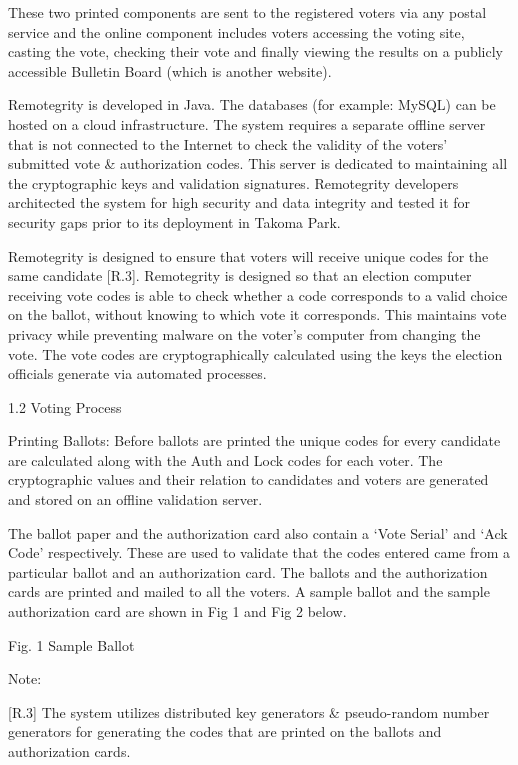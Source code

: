 These two printed components are sent to the registered voters via any postal service and the online component includes voters accessing the voting site, casting the vote, checking their vote and finally viewing the results on a publicly accessible Bulletin Board (which is another website).

Remotegrity is developed in Java. The databases (for example: MySQL) can be hosted on a cloud infrastructure. The system requires a separate offline server that is not connected to the Internet to check the validity of the voters' submitted vote \& authorization codes. This server is dedicated to maintaining all the cryptographic keys and validation signatures. Remotegrity developers architected the system for high security and data integrity and tested it for security gaps prior to its deployment in Takoma Park.

Remotegrity is designed to ensure that voters will receive unique codes for the same candidate [R.3]. Remotegrity is designed so that an election computer receiving vote codes is able to check whether a code corresponds to a valid choice on the ballot, without knowing to which vote it corresponds. This maintains vote privacy while preventing malware on the voter's computer from changing the vote. The vote codes are cryptographically calculated using the keys the election officials generate via automated processes.

1.2 Voting Process

Printing Ballots: Before ballots are printed the unique codes for every candidate are calculated along with the Auth and Lock codes for each voter. The cryptographic values and their relation to candidates and voters are generated and stored on an offline validation server.

The ballot paper and the authorization card also contain a `Vote Serial' and `Ack Code' respectively. These are used to validate that the codes entered came from a particular ballot and an authorization card. The ballots and the authorization cards are printed and mailed to all the voters. A sample ballot and the sample authorization card are shown in Fig 1 and Fig 2 below.

Fig. 1 Sample Ballot


Note:

[R.3] The system utilizes distributed key generators \& pseudo-random number generators for generating the codes that are printed on the ballots and authorization cards.


